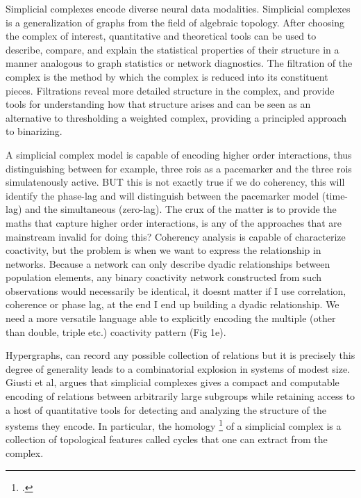 \documentclass[onecollarge,runningheads]{svjour2}
\begin{document}
Simplicial complexes encode diverse neural data modalities. Simplicial complexes is a generalization of graphs from the field of algebraic topology.  After choosing the complex of interest, quantitative and theoretical tools can be used to describe, compare, and explain the statistical properties of their structure in a manner analogous to graph statistics or network diagnostics.
The filtration of the complex is the method by which the complex is reduced into its constituent pieces. Filtrations reveal more detailed structure in the complex, and provide tools for understanding how that structure arises and can be seen as an alternative to thresholding a weighted complex, providing a principled approach to binarizing.

A simplicial complex model is capable of encoding higher order interactions, thus distinguishing between for example, three rois as a pacemarker and the three rois simulatenously active. 
BUT this is not exactly true if we do coherency, this will identify the phase-lag and will distinguish between the pacemarker model (time-lag) and the simultaneous (zero-lag). %
The crux of the matter is to provide the maths that capture higher order interactions, is any of the approaches that are mainstream invalid for doing this?
Coherency analysis is capable of characterize coactivity, but the problem is when we want to express the relationship in networks. Because a network can only describe dyadic relationships between population elements, any binary coactivity network constructed from such observations would necessarily be identical, it doesnt matter if I use correlation, coherence or phase lag, at the end I end up building a dyadic relationship.
We need a more versatile language able to explicitly encoding the multiple (other than double, triple etc.) coactivity pattern (Fig 1e).

Hypergraphs, can record any possible collection of relations but it is precisely this degree of generality leads to a combinatorial explosion in systems of modest size. 
Giusti et al, argues that simplicial complexes gives a compact and computable encoding of relations between arbitrarily large subgroups while retaining access to a host of quantitative tools for detecting and analyzing the structure of the systems they encode. In particular, the homology \footcite{Names of topological objects have a seemingly pathological tendency to conflict with terms in biology, so long have the two subjects been separated. Mathematical homology has no a priori relationship to the usual biological notion of homology} of a simplicial complex is a collection of topological features called cycles that one can extract from the complex.
\end{document}
